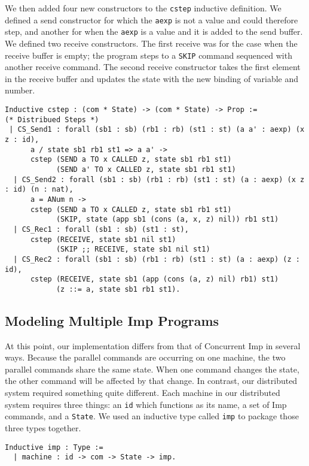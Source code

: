 \documentclass{llncs}
\begin{document}
We then added four new constructors to the \lstinline|cstep| inductive definition. We defined a send constructor for which the \lstinline|aexp| is not a value and could therefore step, and another for when the \lstinline|aexp| is a value and it is added to the send buffer. We defined two receive constructors. The first receive was for the case when the receive buffer is empty; the program steps to a \lstinline|SKIP| command sequenced with another receive command. The second receive constructor takes the first element in the receive buffer and updates the state with the new binding of variable and number. 

\begin{lstlisting}
Inductive cstep : (com * State) -> (com * State) -> Prop :=
(* Distribued Steps *)
 | CS_Send1 : forall (sb1 : sb) (rb1 : rb) (st1 : st) (a a' : aexp) (x z : id),
      a / state sb1 rb1 st1 => a a' -> 
      cstep (SEND a TO x CALLED z, state sb1 rb1 st1) 
            (SEND a' TO x CALLED z, state sb1 rb1 st1)
  | CS_Send2 : forall (sb1 : sb) (rb1 : rb) (st1 : st) (a : aexp) (x z : id) (n : nat),
      a = ANum n ->
      cstep (SEND a TO x CALLED z, state sb1 rb1 st1) 
            (SKIP, state (app sb1 (cons (a, x, z) nil)) rb1 st1)
  | CS_Rec1 : forall (sb1 : sb) (st1 : st),
      cstep (RECEIVE, state sb1 nil st1) 
            (SKIP ;; RECEIVE, state sb1 nil st1)
  | CS_Rec2 : forall (sb1 : sb) (rb1 : rb) (st1 : st) (a : aexp) (z : id),
      cstep (RECEIVE, state sb1 (app (cons (a, z) nil) rb1) st1) 
            (z ::= a, state sb1 rb1 st1).
\end{lstlisting}

\subsection{Modeling Multiple Imp Programs}

At this point, our implementation differs from that of Concurrent Imp in several ways. Because the parallel commands are occurring on one machine, the two parallel commands share the same state. When one command changes the state, the other command will be affected by that change. In contrast, our distributed system required something quite different. Each machine in our distributed system requires three things: an \lstinline|id| which functions as its name, a set of Imp commands, and a \lstinline|State|. We used an inductive type called \lstinline|imp| to package those three types together.

\begin{lstlisting}
Inductive imp : Type :=
  | machine : id -> com -> State -> imp.
\end{lstlisting}
\end{document}
